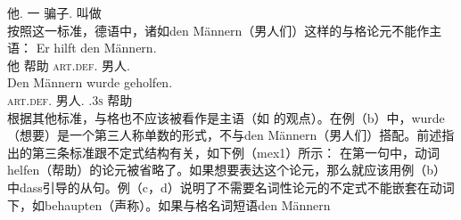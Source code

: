      他.\nom{} \passivepst{} 一 骗子.\nom{} 叫做\\
\zl
按照这一标准，德语中，诸如den Männern（男人们）这样的与格论元不能作主语：
\eal
\ex 
\gll Er hilft den Männern.\\
	 他 帮助 \textsc{art}.\textsc{def}.\dat{} 男人.\dat{}\\
\ex
\label{bsp-den-maennern-wurde-geholfen}
\gll Den Männern wurde geholfen.\\
     \textsc{art}.\textsc{def}.\dat{} 男人.\dat{} \passivepst.3\textsc{s} 帮助\\
\zl
根据其他标准，与格也不应该被看作是主语（如 \citet{Reis82}的观点）。在例（b）中，wurde（想要）是一个第三人称单数的形式，不与den Männern（男人们）搭配。前述指出的第三条标准跟不定式结构有关，如下例（mex{1}）所示：
\eal
{}
\zl
%
在第一句中，动词helfen（帮助）的论元被省略了。如果想要表达这个论元，那么就应该用例（b）中dass引导的从句。例（c，d）说明了不需要名词性论元的不定式不能嵌套在动词下，如behaupten（声称）。如果与格名词短语den Männern
